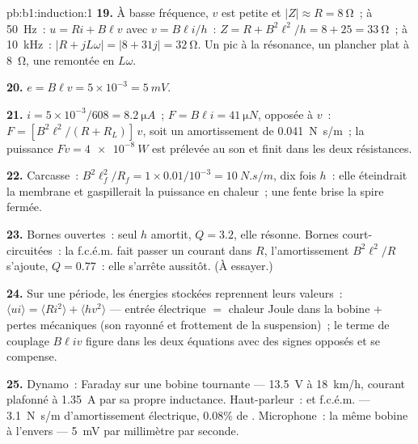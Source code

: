 \begin{solution}{pb:b1:induction:1}
\textbf{19.} À basse fréquence, $v$ est petite et $|Z| \approx R = \qty{8}{\ohm}$~; à
\qty{50}{Hz}~: $u = Ri + B\ell v$ avec $v = B\ell i/h$~: $Z = R + B^2\ell^2/h = 8 + 25 =
\qty{33}{\ohm}$~; à \qty{10}{kHz}~: $|R + jL\omega| = |8 + 31j| = \qty{32}{\ohm}$. Un
pic à la résonance, un plancher plat à \qty{8}{\ohm}, une remontée en $L\omega$.

\textbf{20.} $e = B\ell v = 5 \times 10^{-3} = \qty{5}{mV}$.

\textbf{21.} $i = 5 \times 10^{-3}/608 = \qty{8.2}{\micro A}$~; $F = B\ell i = \qty{41}{\micro N}$,
opposée à $v$~: $F = [B^2\ell^2/(R + R_L)]\,v$, soit un amortissement de \qty{0.041}{N.s/m}~;
la puissance $Fv = \qty{4e-8}{W}$ est prélevée au son et finit dans les
deux résistances.

\textbf{22.} Carcasse~: $B^2\ell_f^2/R_f = 1 \times 0.01/10^{-3} = \qty{10}{N.s/m}$, dix
fois $h$~: elle éteindrait la membrane et gaspillerait la puissance en chaleur~;
une fente brise la spire fermée.

\textbf{23.} Bornes ouvertes~: seul $h$ amortit, $Q = 3.2$, elle résonne. Bornes
court-circuitées~: la f.c.é.m. fait passer un courant dans $R$, l'amortissement
$B^2\ell^2/R$ s'ajoute, $Q = 0.77$~: elle s'arrête aussitôt. (À essayer.)

\textbf{24.} Sur une période, les énergies stockées reprennent leurs valeurs~:
$\langle ui\rangle = \langle Ri^2\rangle + \langle hv^2\rangle$ --- entrée électrique $=$
chaleur Joule dans la bobine $+$ pertes mécaniques (son rayonné et
frottement de la suspension)~; le terme de couplage $B\ell iv$ figure dans les
deux équations avec des signes opposés et se compense.

\textbf{25.} Dynamo~: Faraday sur une bobine tournante --- \qty{13.5}{V} à
\qty{18}{km/h}, courant plafonné à \qty{1.35}{A} par sa propre inductance.
Haut-parleur~:  et f.c.é.m. --- \qty{3.1}{N.s/m} d'amortissement
électrique, $0.08\%$ de . Microphone~: la même bobine à l'envers ---
\qty{5}{mV} par millimètre par seconde.
\end{solution}

